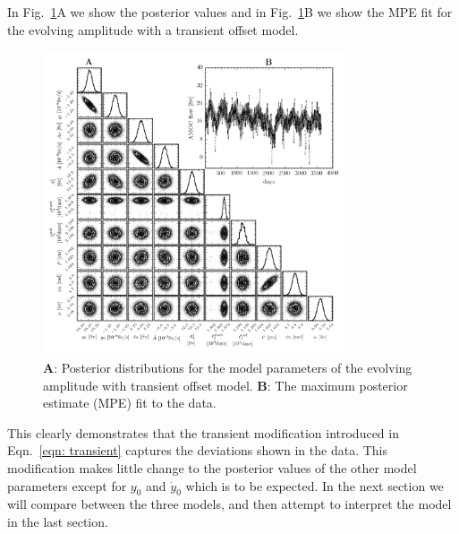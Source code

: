 \documentclass{article}
\begin{document}
In Fig.~\ref{fig: decay amplitude transient}A we show the posterior values and
in Fig.~\ref{fig: decay amplitude transient}B we show the MPE fit for the evolving
amplitude with a transient offset model.
\begin{figure}[htb]
\centering
\includegraphics[width=0.8\textwidth]{img/BasicSinusoidAmplitudeDecayWithTransient_PosteriorWithFit}
\caption{\textbf{A}: Posterior distributions for the model parameters of the
evolving amplitude with transient offset model. \textbf{B}: The maximum posterior estimate (MPE) fit
to the data.}
\label{fig: decay amplitude transient}
\end{figure}
This clearly demonstrates that the transient modification introduced in
Eqn.~\eqref{eqn: transient} captures the deviations shown in the data. This modification
makes little change to the posterior values of the other model parameters except
for $y_0$ and $\dot{y}_0$ which is to be expected. In the next section we will
compare between the three models, and then attempt to interpret the model in
the last section.
\end{document}
